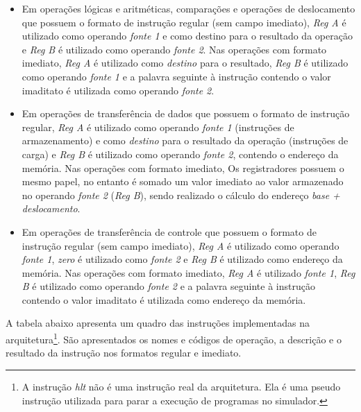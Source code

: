 \documentclass[11pt,a4paper]{report}
\begin{document}
\begin{itemize}
\item Em operações lógicas e aritméticas, comparações e operações de deslocamento
que possuem o formato de instrução regular (sem campo imediato),
\textit{Reg A} é utilizado como operando \textit{fonte 1} e como destino
para o resultado da operação e \textit{Reg B} é utilizado como operando
\textit{fonte 2}. Nas operações com formato imediato, \textit{Reg A} é
utilizado como \textit{destino} para o resultado, \textit{Reg B} é
utilizado como operando \textit{fonte 1} e a palavra seguinte à instrução
contendo o valor imaditato é utilizada como operando \textit{fonte 2}.

\item Em operações de transferência de dados que possuem o formato de instrução
regular, \textit{Reg A} é utilizado como operando \textit{fonte 1}
(instruções de armazenamento) e como \textit{destino} para o resultado
da operação (instruções de carga) e \textit{Reg B} é utilizado como
operando \textit{fonte 2}, contendo o endereço da memória. Nas operações
com formato imediato, Os registradores possuem o mesmo papel, no entanto
é somado um valor imediato ao valor armazenado no operando \textit{fonte 2}
(\textit{Reg B}), sendo realizado o cálculo do endereço \textit{base
+ deslocamento}.

\item Em operações de transferência de controle que possuem o formato de
instrução regular (sem campo imediato), \textit{Reg A} é utilizado como
operando \textit{fonte 1}, \textit{zero} é utilizado como \textit{fonte 2}
e \textit{Reg B} é utilizado como endereço da memória. Nas operações com
formato imediato, \textit{Reg A} é utilizado \textit{fonte 1},
\textit{Reg B} é utilizado como operando \textit{fonte 2} e a palavra
seguinte à instrução contendo o valor imaditato é utilizada como
endereço da memória.
\end{itemize}

A tabela abaixo apresenta um quadro das instruções implementadas na
arquitetura\footnote{A instrução \textit{hlt} não é uma instrução real
da arquitetura. Ela é uma pseudo instrução utilizada para parar a
execução de programas no simulador.}. São apresentados os nomes e códigos
de operação, a descrição e o resultado da instrução nos formatos regular
e imediato.
\end{document}
